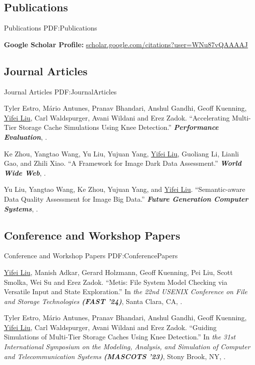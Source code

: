 \documentclass[letterpaper,10pt,oneside]{article}
\begin{document}
\begin{body}

\section
{Publications}
{Publications}
{PDF:Publications}

\textbf{Google Scholar Profile:} \href{https://scholar.google.com/citations?user=WNu87vQAAAAJ}{scholar.google.com/citations?user=WNu87vQAAAAJ}

\subsection
{Journal Articles}
{Journal Articles}
{PDF:JournalArticles}

\NumberedItem{[1]}
Tyler Estro, Mário Antunes, Pranav Bhandari, Anshul Gandhi, Geoff Kuenning, \underline{Yifei Liu}, Carl Waldspurger, Avani Wildani and Erez Zadok.
``Accelerating Multi-Tier Storage Cache Simulations Using Knee Detection.'' 
\textit{\textbf{Performance Evaluation}},
.


\NumberedItem{[2]}
Ke Zhou, Yangtao Wang, Yu Liu, Yujuan Yang, \underline{Yifei Liu}, Guoliang Li, Lianli Gao, and Zhili Xiao.
``A Framework for Image Dark Data Assessment.'' 
\textit{\textbf{World Wide Web}},
.


\NumberedItem{[3]}
Yu Liu, Yangtao Wang, Ke Zhou, Yujuan Yang, and \underline{Yifei Liu}.
``Semantic-aware Data Quality Assessment for Image Big Data.'' 
\textit{\textbf{Future Generation Computer Systems}},
.

\subsection
{Conference and Workshop Papers}
{Conference and Workshop Papers}
{PDF:ConferencePapers}

\NumberedItem{[1]}
\underline{Yifei Liu}, Manish Adkar, Gerard Holzmann, Geoff Kuenning, Pei Liu, Scott Smolka, Wei Su and Erez Zadok.
``Metis: File System Model Checking via Versatile Input and State Exploration.''
In \textit{the 22nd USENIX Conference on File and Storage Technologies
\textbf{(FAST '24)}}, Santa Clara, CA,
. 

\NumberedItem{[2]}
Tyler Estro, Mário Antunes, Pranav Bhandari, Anshul Gandhi, Geoff Kuenning, \underline{Yifei Liu}, Carl Waldspurger, Avani Wildani and Erez Zadok.
``Guiding Simulations of Multi-Tier Storage Caches Using Knee Detection.''
In \textit{the 31st International Symposium on the Modeling, Analysis, and Simulation of Computer and Telecommunication Systems \textbf{(MASCOTS '23)}}, Stony Brook, NY,
. 


\end{body}
\end{document}
